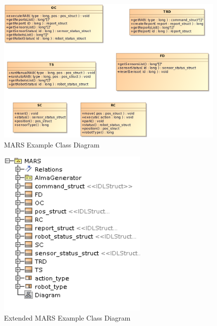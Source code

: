 \begin{figure}
  \begin{center}
  \includegraphics[width=\textwidth]{images/MARS-classdiagram.png}
  \end{center}
  \caption{MARS Example Class Diagram}
  \label{fg:MARSclassDiagram}
\end{figure}


\begin{figure}
  \begin{center}
  \includegraphics[width=0.65\textwidth]{images/MARS-classdiagram-full.png}
  \end{center}
  \caption{Extended MARS Example Class Diagram}
  \label{fg:ExtendedMARSclassDiagram}
\end{figure}

